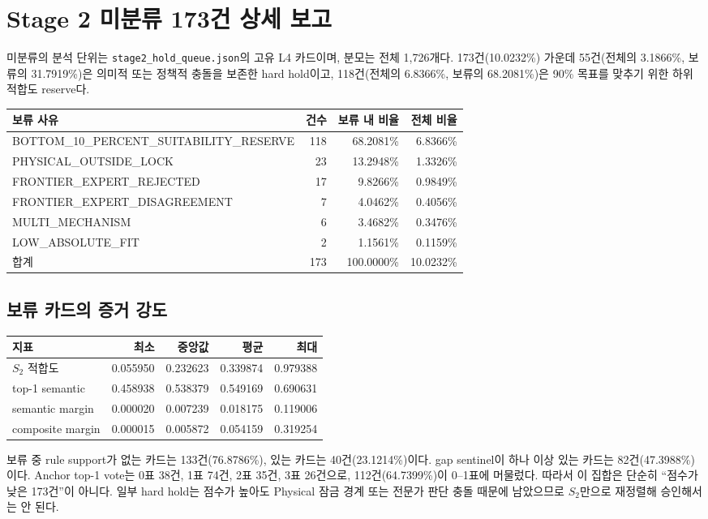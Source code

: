 \documentclass[11pt,a4paper]{article}
\newcommand{\code}[1]{\texttt{#1}}
\begin{document}
\section{Stage 2 미분류 173건 상세 보고}

미분류의 분석 단위는 \code{stage2\_hold\_queue.json}의 고유 L4 카드이며,
분모는 전체 1,726개다. 173건(10.0232\%) 가운데 55건(전체의 3.1866\%,
보류의 31.7919\%)은 의미적 또는 정책적 충돌을 보존한 hard hold이고,
118건(전체의 6.8366\%, 보류의 68.2081\%)은 90\% 목표를 맞추기 위한
하위 적합도 reserve다.

\begin{longtable}{lrrr}
\toprule
보류 사유 & 건수 & 보류 내 비율 & 전체 비율 \\
\midrule
\endhead
BOTTOM\_10\_PERCENT\_SUITABILITY\_RESERVE & 118 & 68.2081\% & 6.8366\% \\
PHYSICAL\_OUTSIDE\_LOCK & 23 & 13.2948\% & 1.3326\% \\
FRONTIER\_EXPERT\_REJECTED & 17 & 9.8266\% & 0.9849\% \\
FRONTIER\_EXPERT\_DISAGREEMENT & 7 & 4.0462\% & 0.4056\% \\
MULTI\_MECHANISM & 6 & 3.4682\% & 0.3476\% \\
LOW\_ABSOLUTE\_FIT & 2 & 1.1561\% & 0.1159\% \\
\midrule
합계 & 173 & 100.0000\% & 10.0232\% \\
\bottomrule
\end{longtable}

\subsection{보류 카드의 증거 강도}

\begin{table}[h]
\centering
\begin{tabular}{lrrrr}
\toprule
지표 & 최소 & 중앙값 & 평균 & 최대 \\
\midrule
$S_2$ 적합도 & 0.055950 & 0.232623 & 0.339874 & 0.979388 \\
top-1 semantic & 0.458938 & 0.538379 & 0.549169 & 0.690631 \\
semantic margin & 0.000020 & 0.007239 & 0.018175 & 0.119006 \\
composite margin & 0.000015 & 0.005872 & 0.054159 & 0.319254 \\
\bottomrule
\end{tabular}
\end{table}

보류 중 rule support가 없는 카드는 133건(76.8786\%), 있는 카드는
40건(23.1214\%)이다. gap sentinel이 하나 이상 있는 카드는 82건(47.3988\%)이다.
Anchor top-1 vote는 0표 38건, 1표 74건, 2표 35건, 3표 26건으로,
112건(64.7399\%)이 0--1표에 머물렀다. 따라서 이 집합은 단순히 ``점수가 낮은
173건''이 아니다. 일부 hard hold는 점수가 높아도 Physical 잠금 경계 또는 전문가
판단 충돌 때문에 남았으므로 $S_2$만으로 재정렬해 승인해서는 안 된다.
\end{document}

